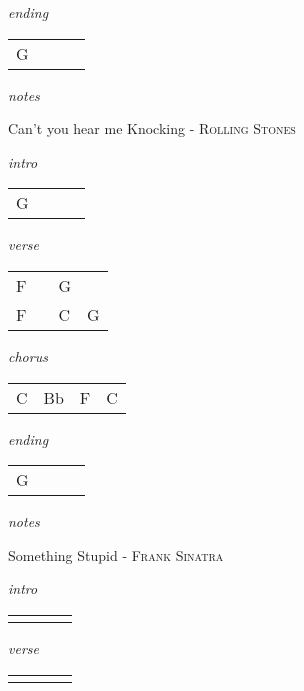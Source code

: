 \documentclass[12pt]{article}
\begin{document}
\textit{ending}

\begin{tabular}{|P{1.25in}|P{1.25in}|P{1.25in}|P{1.25in}|}
  G &   &   &   \\
\end{tabular}

\textit{notes}

\newpage

{\Huge Can't you hear me Knocking} {\huge - \textsc{Rolling Stones}}

\huge
\textit{intro}

\begin{tabular}{|P{1.25in}|P{1.25in}|P{1.25in}|P{1.25in}|}
  G &   &   &   \\
\end{tabular}

\textit{verse}

\begin{tabular}{|P{1.25in}|P{1.25in}|P{1.25in}|P{1.25in}|}
  F &   & G  &   \\
  F &   & C  & G
\end{tabular}

\textit{chorus}

\begin{tabular}{|P{1.25in}|P{1.25in}|P{1.25in}|P{1.25in}|}
  C & Bb  & F  &  C  \\
\end{tabular}

\textit{ending}

\begin{tabular}{|P{1.25in}|P{1.25in}|P{1.25in}|P{1.25in}|}
  G &   &   &   \\
\end{tabular}

\textit{notes}

\newpage

{\Huge Something Stupid} {\huge - \textsc{Frank Sinatra}}

\huge
\textit{intro}

\begin{tabular}{|P{1.25in}|P{1.25in}|P{1.25in}|P{1.25in}|}
    &   &   &   \\
\end{tabular}

\textit{verse}

\begin{tabular}{|P{1.25in}|P{1.25in}|P{1.25in}|P{1.25in}|}
    &   &   &   \\
\end{tabular}
\end{document}
